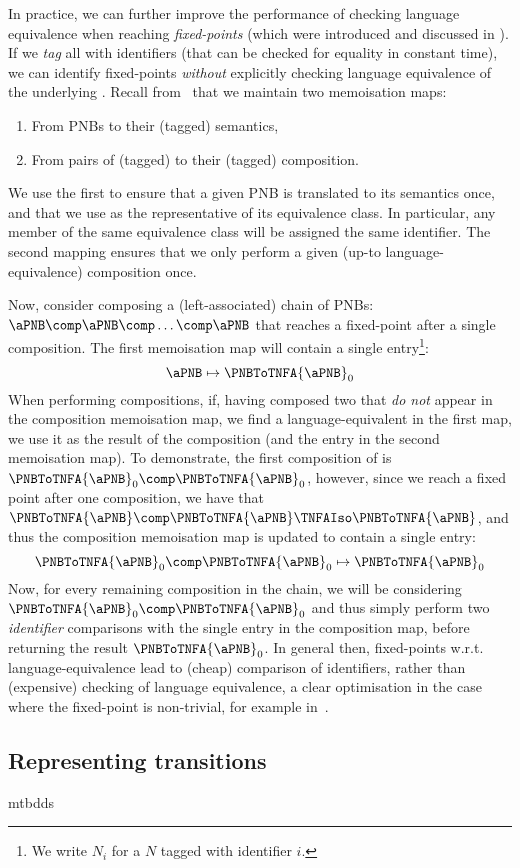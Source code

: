 In practice, we can further improve the performance of checking language
equivalence when reaching \emph{fixed-points} (which were introduced and
discussed in ). If we \emph{tag} all \TNFA{} with
identifiers (that can be checked for equality in constant time), we can
identify fixed-points \emph{without} explicitly checking language equivalence
of the underlying \TNFA{}. Recall from~ that we
maintain two memoisation maps:
\begin{enumerate}
    \item From PNBs to their (tagged) \TNFA{} semantics,
    \item From pairs of (tagged) \TNFA{} to their (tagged) \TNFA{} composition.
\end{enumerate}
We use the first to ensure that a given PNB is translated to its \TNFA{}
semantics once, and that we use \TNFA{} as the representative of its
equivalence class. In particular, any member of the same equivalence class will
be assigned the same identifier. The second mapping ensures that we only
perform a given (up-to language-equivalence) composition once.

Now, consider composing a (left-associated) chain of PNBs: $\aPNB \comp \aPNB
\comp \ldots \comp \aPNB$ that reaches a fixed-point after a single
composition. The first memoisation map will contain a single entry\footnote{We
write $N_i$ for a \TNFA{} $N$ tagged with identifier $i$.}:
\[
    \aPNB \mapsto \PNBToTNFA{\aPNB}_0
\]
When performing \TNFA{} compositions, if, having composed two \TNFA{} that
\emph{do not} appear in the composition memoisation map, we find a
language-equivalent \TNFA{} in the first map, we use it as the result of the
composition (and the entry in the second memoisation map). To demonstrate, the
first composition of \TNFA{} is $\PNBToTNFA{\aPNB}_0 \comp
\PNBToTNFA{\aPNB}_0$, however, since we reach a fixed point after one
composition, we have that $\PNBToTNFA{\aPNB} \comp \PNBToTNFA{\aPNB} \TNFAIso
\PNBToTNFA{\aPNB}$, and thus the composition memoisation map is updated to
contain a single entry:
\[
    \PNBToTNFA{\aPNB}_0 \comp \PNBToTNFA{\aPNB}_0 \mapsto \PNBToTNFA{\aPNB}_0
\]
Now, for every remaining composition in the chain, we will be considering
$\PNBToTNFA{\aPNB}_0 \comp \PNBToTNFA{\aPNB}_0$ and thus simply perform two
\emph{identifier} comparisons with the single entry in the composition map,
before returning the result $\PNBToTNFA{\aPNB}_0$. In general then,
fixed-points w.r.t. language-equivalence lead to (cheap) comparison of
identifiers, rather than (expensive) checking of language equivalence, a clear
optimisation in the case where the fixed-point is non-trivial, for example
in~.

\subsection{Representing \TNFA{} transitions}\label{sec:mtbdds}
{mtbdds}
